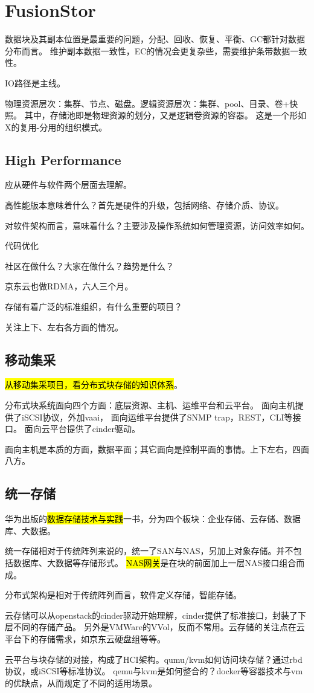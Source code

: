 \chapter{FusionStor}

数据块及其副本位置是最重要的问题，分配、回收、恢复、平衡、GC都针对数据分布而言。
维护副本数据一致性，EC的情况会更复杂些，需要维护条带数据一致性。

IO路径是主线。

物理资源层次：集群、节点、磁盘。逻辑资源层次：集群、pool、目录、卷+快照。
其中，存储池即是物理资源的划分，又是逻辑卷资源的容器。
这是一个形如X的复用-分用的组织模式。

\section{High Performance}

应从硬件与软件两个层面去理解。

高性能版本意味着什么？首先是硬件的升级，包括网络、存储介质、协议。

对软件架构而言，意味着什么？主要涉及操作系统如何管理资源，访问效率如何。

代码优化

社区在做什么？大家在做什么？趋势是什么？

京东云也做RDMA，六人三个月。

存储有着广泛的标准组织，有什么重要的项目？

关注上下、左右各方面的情况。

\section{移动集采}

\hl{从移动集采项目，看分布式块存储的知识体系}。

分布式块系统面向四个方面：底层资源、主机、运维平台和云平台。
面向主机提供了iSCSI协议，外加vaai，
面向运维平台提供了SNMP trap，REST，CLI等接口。
面向云平台提供了cinder驱动。

面向主机是本质的方面，数据平面；其它面向是控制平面的事情。上下左右，四面八方。

\section{统一存储}

华为出版的\hl{数据存储技术与实践}一书，分为四个板块：企业存储、云存储、数据库、大数据。

统一存储相对于传统阵列来说的，统一了SAN与NAS，另加上对象存储。并不包括数据库、大数据等存储形式。
\hl{NAS网关}是在块的前面加上一层NAS接口组合而成。

分布式架构是相对于传统阵列而言，软件定义存储，智能存储。

云存储可以从openstack的cinder驱动开始理解，cinder提供了标准接口，封装了下层不同的存储产品。
另外是VMWare的VVol，反而不常用。云存储的关注点在云平台下的存储需求，如京东云硬盘组等等。

云平台与块存储的对接，构成了HCI架构。qumu/kvm如何访问块存储？通过rbd协议，或iSCSI等标准协议。
qemu与kvm是如何整合的？docker等容器技术与vm的优缺点，从而规定了不同的适用场景。

